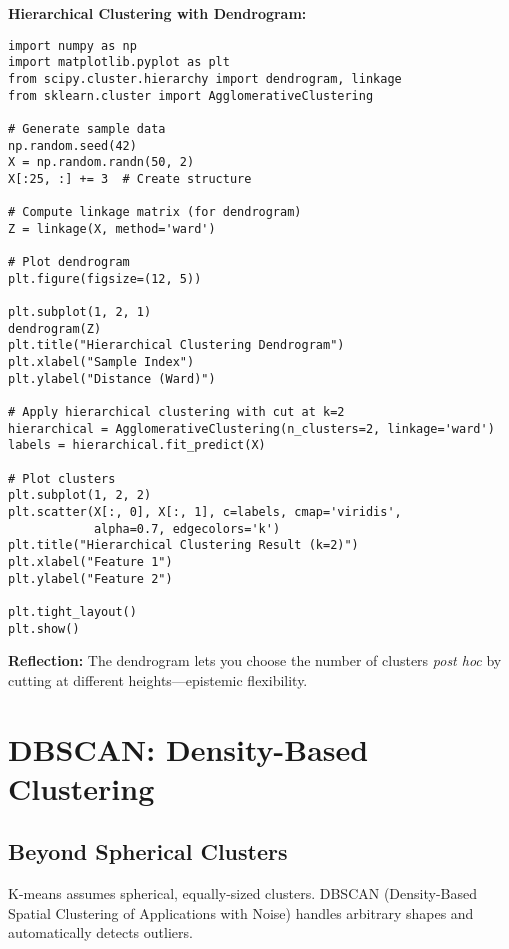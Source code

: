 \begin{codebox}
\textbf{Hierarchical Clustering with Dendrogram:}

\begin{lstlisting}
import numpy as np
import matplotlib.pyplot as plt
from scipy.cluster.hierarchy import dendrogram, linkage
from sklearn.cluster import AgglomerativeClustering

# Generate sample data
np.random.seed(42)
X = np.random.randn(50, 2)
X[:25, :] += 3  # Create structure

# Compute linkage matrix (for dendrogram)
Z = linkage(X, method='ward')

# Plot dendrogram
plt.figure(figsize=(12, 5))

plt.subplot(1, 2, 1)
dendrogram(Z)
plt.title("Hierarchical Clustering Dendrogram")
plt.xlabel("Sample Index")
plt.ylabel("Distance (Ward)")

# Apply hierarchical clustering with cut at k=2
hierarchical = AgglomerativeClustering(n_clusters=2, linkage='ward')
labels = hierarchical.fit_predict(X)

# Plot clusters
plt.subplot(1, 2, 2)
plt.scatter(X[:, 0], X[:, 1], c=labels, cmap='viridis', 
            alpha=0.7, edgecolors='k')
plt.title("Hierarchical Clustering Result (k=2)")
plt.xlabel("Feature 1")
plt.ylabel("Feature 2")

plt.tight_layout()
plt.show()
\end{lstlisting}

\textbf{Reflection:} The dendrogram lets you choose the number of clusters \textit{post hoc} by cutting at different heights---epistemic flexibility.
\end{codebox}

\section{DBSCAN: Density-Based Clustering}

\subsection{Beyond Spherical Clusters}

K-means assumes spherical, equally-sized clusters. DBSCAN (Density-Based Spatial Clustering of Applications with Noise) handles arbitrary shapes and automatically detects outliers.

